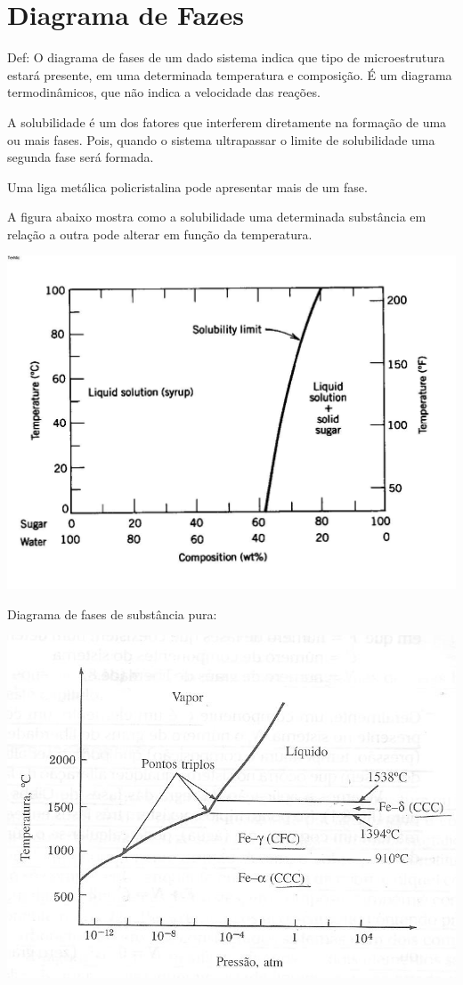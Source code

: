 \section{Diagrama de Fazes}

Def: O diagrama de fases de um dado sistema indica que tipo de microestrutura estará presente, em uma determinada temperatura e composição. É um diagrama termodinâmicos, que não indica a velocidade das reações.

A solubilidade é um dos fatores que interferem diretamente na formação de uma ou mais fases. Pois, quando o sistema ultrapassar o limite de solubilidade uma segunda fase será formada.

Uma liga metálica policristalina pode apresentar mais de um fase.

A figura abaixo mostra como a solubilidade uma determinada substância em relação a outra pode alterar em função da temperatura.


\includegraphics[scale=0.3,trim={0 0 0 0}]{figures/soluTemp}

Diagrama de fases de substância pura: 

\includegraphics[scale=0.4,trim={0 0 0 0}]{figures/diagramFe}

